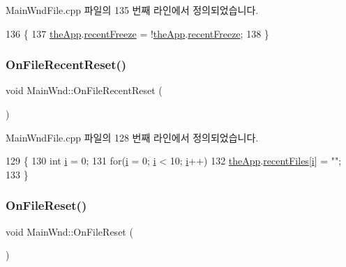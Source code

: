 Main\+Wnd\+File.\+cpp 파일의 135 번째 라인에서 정의되었습니다.


\begin{DoxyCode}
136 \{
137   \mbox{\hyperlink{_v_b_a_8cpp_a8095a9d06b37a7efe3723f3218ad8fb3}{theApp}}.\mbox{\hyperlink{class_v_b_a_a673f86057f7d022a426a1c1c3d6de36f}{recentFreeze}} = !\mbox{\hyperlink{_v_b_a_8cpp_a8095a9d06b37a7efe3723f3218ad8fb3}{theApp}}.\mbox{\hyperlink{class_v_b_a_a673f86057f7d022a426a1c1c3d6de36f}{recentFreeze}};
138 \}
\end{DoxyCode}
\mbox{\label{class_main_wnd_ae80656d038d25f9d3ad2dc7b0d283a54}} 
\subsubsection{\texorpdfstring{On\+File\+Recent\+Reset()}{OnFileRecentReset()}}
{\footnotesize\ttfamily void Main\+Wnd\+::\+On\+File\+Recent\+Reset (\begin{DoxyParamCaption}{ }\end{DoxyParamCaption})\hspace{0.3cm}{\ttfamily [protected]}}



Main\+Wnd\+File.\+cpp 파일의 128 번째 라인에서 정의되었습니다.


\begin{DoxyCode}
129 \{
130   \textcolor{keywordtype}{int} \mbox{\hyperlink{expr-lex_8cpp_acb559820d9ca11295b4500f179ef6392}{i}} = 0;
131   \textcolor{keywordflow}{for}(\mbox{\hyperlink{expr-lex_8cpp_acb559820d9ca11295b4500f179ef6392}{i}} = 0; \mbox{\hyperlink{expr-lex_8cpp_acb559820d9ca11295b4500f179ef6392}{i}} < 10; \mbox{\hyperlink{expr-lex_8cpp_acb559820d9ca11295b4500f179ef6392}{i}}++)
132     \mbox{\hyperlink{_v_b_a_8cpp_a8095a9d06b37a7efe3723f3218ad8fb3}{theApp}}.\mbox{\hyperlink{class_v_b_a_ab5efdeee24caf6cec163a3f51b50bf64}{recentFiles}}[\mbox{\hyperlink{expr-lex_8cpp_acb559820d9ca11295b4500f179ef6392}{i}}] = \textcolor{stringliteral}{""};
133 \}
\end{DoxyCode}
\mbox{\label{class_main_wnd_ac61e74030dfc91e1439e7b4c6c4ee59c}} 
\subsubsection{\texorpdfstring{On\+File\+Reset()}{OnFileReset()}}
{\footnotesize\ttfamily void Main\+Wnd\+::\+On\+File\+Reset (\begin{DoxyParamCaption}{ }\end{DoxyParamCaption})\hspace{0.3cm}{\ttfamily [protected]}}




